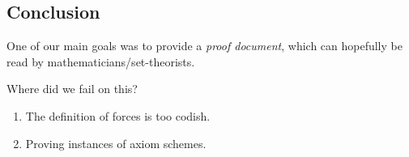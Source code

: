 \subsection{Conclusion}
\label{sec:conclusion}

One of our main goals was to provide a \emph{proof document}, which
can hopefully be read by mathematicians/set-theorists.

Where did we fail on this?
\begin{enumerate}
\item
  The definition of forces is too codish.
\item
  Proving instances of axiom schemes.
\end{enumerate}

